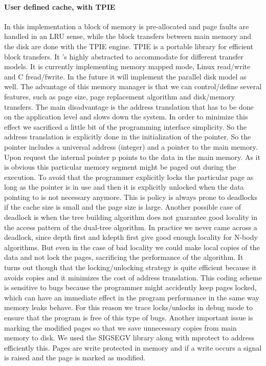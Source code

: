\documentclass[12pt,letterpaper,doublespaced,ETD,dvips,proposal]{gtthesis}
\begin{document}
\begin{Body}
\paragraph{User defined cache, with TPIE} In this implementation a block of
memory is pre-allocated and page faults are handled in an LRU sense,
while the block transfers between main memory and the disk are done
with the TPIE engine. TPIE is a portable library for efficient block
transfers. It 's highly abstracted to accommodate for different
transfer models. It is currently implementing memory mapped mode,
Linux read/write and C fread/fwrite. In the future it will implement
the parallel disk model as well. The advantage of this memory
manager is that we can control/define several features, such as page
size, page replacement algorithm and disk/memory transfers. The main
disadvantage is the address translation that has to be done on the
application level and slows down the system. In order to minimize
this effect we sacrificed a little bit of the programming interface
simplicity. So the address translation is explicitly done in the
initialization of the pointer. So the pointer includes a universal
address (integer) and a pointer to the main memory. Upon request the
internal pointer p points to the data in the main memory. As it is
obvious this particular memory segment might be paged out during the
execution. To avoid that the programmer explicitly locks the
particular page as long as the pointer is in use and then it is
explicitly unlocked when the data pointing to is not necessary
anymore. This is  policy is always prone to deadlocks if the cache
size is small and the page size is large. Another possible case of
deadlock is when the tree building algorithm does not guarantee good
locality in the access pattern of the dual-tree algorithm. In
practice we never came across a deadlock, since depth first and
kdepth first give good enough locality for N-body algorithms. But
even in the case of bad locality we could make local copies of the
data and not lock the pages, sacrificing the performance of the
algorithm. It turns out though that the locking/unlocking strategy
is quite efficient because it avoids copies and it minimizes the
cost of address translation. This coding scheme is sensitive to bugs
because the programmer might accidently keep pages locked, which can
have an immediate effect in the program performance in the same way
memory leaks behave. For this reason we trace locks/unlocks in debug
mode to ensure that the program is free of this type of bugs.
Another important issue is marking the modified pages so that we
save unnecessary copies from main memory to disk. We used the
SIGSEGV library along with mprotect to address efficiently this.
Pages are write protected in memory and if a write occurs a signal
is raised and the page is marked as modified.


\end{Body}
\end{document}
